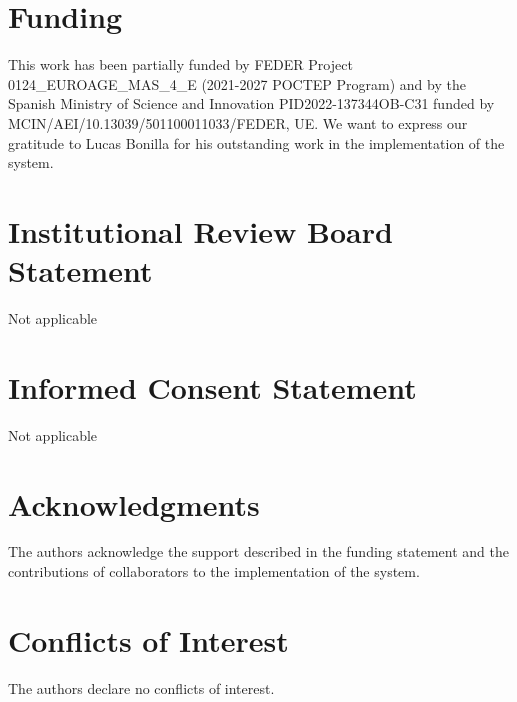 \documentclass[10pt,a4paper]{article}
\begin{document}
\section*{Funding}
This work has been partially funded by FEDER Project 0124\_EUROAGE\_MAS\_4\_E (2021-2027 POCTEP Program) and by the Spanish Ministry of Science and Innovation PID2022-137344OB-C31 funded by MCIN/AEI/10.13039/501100011033/FEDER, UE. We want to express our gratitude to Lucas Bonilla for his outstanding work in the implementation of the system.

\section*{Institutional Review Board Statement}
Not applicable

\section*{Informed Consent Statement}
Not applicable

\section*{Acknowledgments}
The authors acknowledge the support described in the funding statement and the contributions of collaborators to the implementation of the system.

\section*{Conflicts of Interest}
The authors declare no conflicts of interest.
\end{document}
